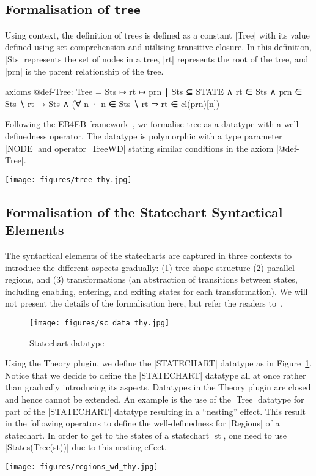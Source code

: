 \subsection{Formalisation of \texttt{tree}}
Using context, the definition of trees is defined as a constant |Tree| with its value defined using set comprehension and utilising transitive closure. In this definition, |Sts| represents the set of nodes in a tree, |rt| represents the root of the tree, and |prn| is the parent relationship of the tree.
\begin{EventBcode}
axioms @def-Tree: Tree = {Sts ↦ rt ↦ prn ∣
			Sts ⊆ STATE ∧ rt ∈ Sts ∧ prn ∈ Sts ∖ {rt} → Sts ∧ (∀ n · n ∈ Sts ∖ {rt} ⇒ rt ∈ cl(prn)[{n}])}
\end{EventBcode}
Following the EB4EB framework~\cite{DBLP:conf/nfm/RiviereSAD23}, we formalise tree as a datatype with a well-definedness operator. The datatype is polymorphic with a type parameter |NODE| and  operator |TreeWD| stating similar conditions in the axiom |@def-Tree|.
\begin{center}
    \texttt{[image: figures/tree\_thy.jpg]}
\end{center}

\subsection{Formalisation of the Statechart Syntactical Elements}
The syntactical elements of the statecharts are captured in three contexts to introduce the different aspects gradually: (1) tree-shape structure (2) parallel regions, and (3) transformations (an abstraction of transitions between states, including enabling, entering, and exiting states for each transformation). We will not present the details of the formalisation here, but refer the readers to~\cite{DBLP:conf/ictac/WrightHSB23}.
\begin{figure}[!h]
    \centering
    \texttt{[image: figures/sc\_data\_thy.jpg]}
    \caption{Statechart datatype}
    \label{fig:sc-data-thy}
\end{figure}
Using the Theory plugin, we define the |STATECHART| datatype as in Figure~\ref{fig:sc-data-thy}. Notice that we decide to define the |STATECHART| datatype all at once rather than gradually introducing its aspects. Datatypes in the Theory plugin are closed and hence cannot be extended. An example is the use of the |Tree| datatype for part of the |STATECHART| datatype resulting in a ``nesting'' effect. This result in the following operators to define the well-definedness for |Regions| of a statechart. In order to get to the states of a statechart |st|, one need to use |States(Tree(st))| due to this nesting effect.
\begin{center}
    \texttt{[image: figures/regions\_wd\_thy.jpg]}
\end{center}

